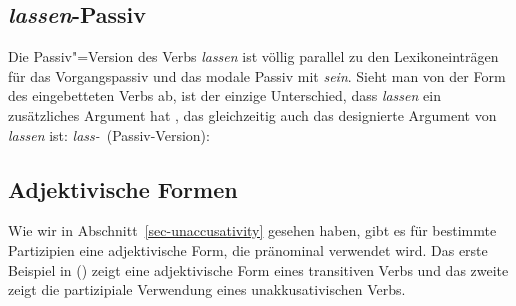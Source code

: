 {\subsection{\emph{lassen}-Passiv}
\label{lassen-passive-da}


Die Passiv"=Version des Verbs \emph{lassen} ist völlig parallel
zu den Lexikoneinträgen für das Vorgangspassiv 
und das modale Passiv mit \emph{sein}. Sieht man von der Form des eingebetteten Verbs ab, ist der
einzige Unterschied, dass \emph{lassen} ein zusätzliches Argument hat ,
das gleichzeitig auch das designierte Argument von \emph{lassen} ist:
\eas
\label{le-lassen-passive-da}%
\mbox{\emph{lass-} (Passiv-Version):} \\
\ms{
 head$|$da     & \sliste{ \ibox{1} }\\
 arg-st & \sliste{ \ibox{1} NP[\type{str}] } $\oplus$ \ibox{2} $\oplus$ \liste{ V[\type{bse}, \textsc{lex}+, \textsc{da}~\sliste{ NP\sub{\type{ref}}}, \textsc{comps}~\ibox{2}]}
}
\zs




\subsection{Adjektivische Formen}
\label{sec-adj-formation}


Wie wir in Abschnitt~\ref{sec-unaccusativity} gesehen haben, gibt
es für bestimmte Partizipien eine adjektivische Form, die
pränominal verwendet wird. Das erste Beispiel in () zeigt eine
adjektivische Form eines transitiven Verbs und das zweite
zeigt die partizipiale Verwendung eines unakkusativischen Verbs.

}
